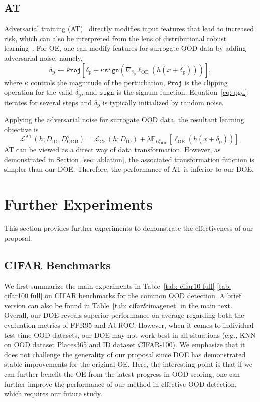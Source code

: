 \documentclass{article} \usepackage{iclr2022_conference,times}
\def\Eqref#1{Equation~\ref{#1}}
\begin{document}
\subsection{AT}
Adversarial training (AT)~\citep{MadryMSTV18} directly modifies input features that lead to increased risk, which can also be interpreted from the lens of distributional robust learning~\citep{SinhaND18}. For OE, one can modify features for surrogate OOD data by adding adversarial noise, namely,
\begin{equation}
    \delta_\text{p} \leftarrow \texttt{Proj}\left[\delta_\text{p}+\kappa\texttt{sign}\left(\nabla_{\delta_\text{p}}\ell_\text{OE}(h(x+\delta_\text{p}))\right)\right], \label{eq: pgd}
\end{equation}
where $\kappa$ controls the magnitude of the perturbation,  $\texttt{Proj}$ is the clipping operation for the valid $\delta_\text{p}$, and $\texttt{sign}$ is the signum function. \Eqref{eq: pgd} iterates for several steps and 
$\delta_\text{p}$ is typically initialized by random noise. 

Applying the adversarial noise for surrogate OOD data, the resultant learning objective is 
\begin{equation}
    {\mathcal{L}}^\text{AT}(h;D_\text{ID}, D_\text{OOD}^\text{s})={\mathcal{L}}_\text{CE}(h; D_\text{ID}) + \lambda  \mathbb{E}_{D_\text{OOD}^\text{s}} \left[\ell_\text{OE} (h(x+\delta_\text{p}))\right].
\end{equation}
AT can be viewed as a direct way of data transformation. However, as demonstrated in Section~\ref{sec: ablation}, the associated transformation function is simpler than our DOE. Therefore, the performance of AT is inferior to our DOE.  

\clearpage
\section{Further Experiments} \label{app: exp}

This section provides further experiments to demonstrate the effectiveness of our proposal. 

\subsection{CIFAR Benchmarks}\label{app: cifar}

We first summarize the main experiments in Table~\ref{tab: cifar10 full}-\ref{tab: cifar100 full} on CIFAR benchmarks for the common OOD detection. A brief version can also be found in Table~\ref{tab: cifar&imagenet} in the main text. Overall, our DOE reveals superior performance on average regarding both the evaluation metrics of FPR$95$ and AUROC. However, when it comes to individual test-time OOD datasets, our DOE may not work best in all situations (e.g., KNN on OOD dataset Places365 and ID dataset CIFAR-100). We emphasize that it does not challenge the generality of our proposal since DOE has demonstrated stable improvements for the original OE. Here, the interesting point is that if we can further benefit the OE from the latest progress in OOD scoring, one can further improve the performance of our method in effective OOD detection, which requires our future study. 
\end{document}

